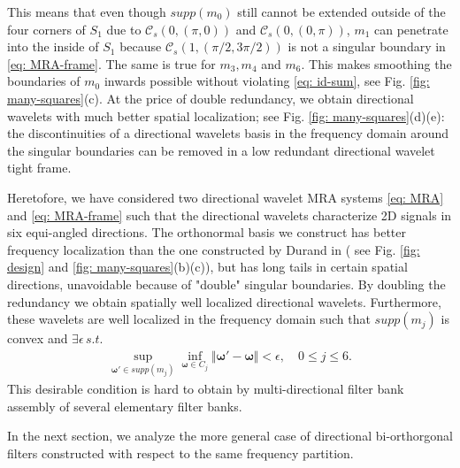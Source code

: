 This means that even though $supp(m_0)$ still cannot be extended outside of the four corners of $S_1$ due to $\mathcal{C}_s(0,(\pi,0))$ and $\mathcal{C}_s(0,(0,\pi))$, $m_1$ can penetrate into the inside of $S_1$ because $\mathcal{C}_s(1,(\pi/2,3\pi/2))$ is not a singular boundary in \eqref{eq: MRA-frame}. The same is true for $m_3,m_4$ and $m_6$. This makes smoothing the boundaries of $m_0$ inwards possible without violating \eqref{eq: id-sum}, see Fig. \ref{fig: many-squares}(c). At the price of double redundancy, we obtain directional wavelets with much better spatial localization; see Fig. \ref{fig: many-squares}(d)(e):
the discontinuities of a directional wavelets basis in the frequency domain around the singular boundaries can be removed in a low redundant directional wavelet tight frame.

Heretofore, we have considered two directional wavelet MRA systems \eqref{eq: MRA} and \eqref{eq: MRA-frame} such that the directional wavelets characterize 2D signals in six equi-angled directions. 
The orthonormal basis we construct has better frequency localization than the one constructed by Durand in \cite{durand2007} ( see Fig. \ref{fig: design} and \ref{fig: many-squares}(b)(c)), but has long tails in certain spatial directions, unavoidable because of "double" singular boundaries. 
By doubling the redundancy we obtain spatially well localized directional wavelets.
Furthermore, these wavelets are well localized in the frequency domain such that $supp(m_j)$ is convex and $\exists\epsilon\, s.t.$
\begin{align}\label{eq: no-alians}
 \sup_{\boldsymbol{\omega}'\in supp(m_j)}\inf_{\boldsymbol{\omega}\in C_j}\Vert\boldsymbol{\omega'} - \boldsymbol{\omega}\Vert < \epsilon,\quad  0\leq j\leq 6.
\end{align}
This desirable condition is hard to obtain by multi-directional filter bank assembly of several elementary filter banks.

In the next section, we analyze the more general case of directional bi-orthorgonal filters constructed with respect to the same frequency partition. 